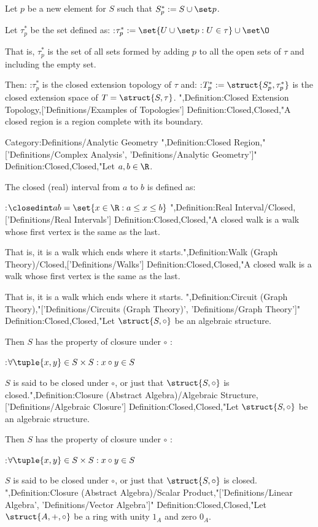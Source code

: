 Let $p$ be a new element for $S$ such that $S^*_p := S \cup \set p$.


Let $\tau^*_p$ be the set defined as:
:$\tau^*_p := \set {U \cup \set p: U \in \tau} \cup \set \O$

That is, $\tau^*_p$ is the set of all sets formed by adding $p$ to all the open sets of $\tau$ and including the empty set.


Then:
:$\tau^*_p$ is the closed extension topology of $\tau$
and:
:$T^*_p := \struct {S^*_p, \tau^*_p}$ is the closed extension space of $T = \struct {S, \tau}$.
",Definition:Closed Extension Topology,['Definitions/Examples of Topologies']
Definition:Closed,Closed,"A closed region is a region complete with its boundary.


Category:Definitions/Analytic Geometry
",Definition:Closed Region,"['Definitions/Complex Analysis', 'Definitions/Analytic Geometry']"
Definition:Closed,Closed,"Let $a, b \in \R$.

The closed (real) interval from $a$ to $b$ is defined as:

:$\closedint a b = \set {x \in \R: a \le x \le b}$
",Definition:Real Interval/Closed,['Definitions/Real Intervals']
Definition:Closed,Closed,"A closed walk is a walk whose first vertex is the same as the last.

That is, it is a walk which ends where it starts.",Definition:Walk (Graph Theory)/Closed,['Definitions/Walks']
Definition:Closed,Closed,"A closed walk is a walk whose first vertex is the same as the last.

That is, it is a walk which ends where it starts.
",Definition:Circuit (Graph Theory),"['Definitions/Circuits (Graph Theory)', 'Definitions/Graph Theory']"
Definition:Closed,Closed,"Let $\struct {S, \circ}$ be an algebraic structure.


Then $S$ has the property of closure under $\circ$ :

:$\forall \tuple {x, y} \in S \times S: x \circ y \in S$


$S$ is said to be closed under $\circ$, or just that $\struct {S, \circ}$ is closed.",Definition:Closure (Abstract Algebra)/Algebraic Structure,['Definitions/Algebraic Closure']
Definition:Closed,Closed,"Let $\struct {S, \circ}$ be an algebraic structure.


Then $S$ has the property of closure under $\circ$ :

:$\forall \tuple {x, y} \in S \times S: x \circ y \in S$


$S$ is said to be closed under $\circ$, or just that $\struct {S, \circ}$ is closed.
",Definition:Closure (Abstract Algebra)/Scalar Product,"['Definitions/Linear Algebra', 'Definitions/Vector Algebra']"
Definition:Closed,Closed,"Let $\struct {A, +, \circ}$ be a ring with unity $1_A$ and zero $0_A$.

